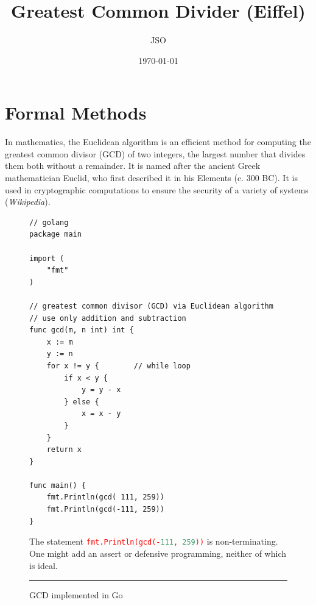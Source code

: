 \documentclass[runningheads,12pt]{article}
\newcommand{\e}[1]{\lstinline[language=eiffel]|#1|}
\begin{document}
\title{Greatest Common Divider (Eiffel)}
\author{JSO}
\date{\today}

\maketitle
\tableofcontents

\section{Formal Methods}

In mathematics, the Euclidean algorithm is an efficient method for computing the greatest common divisor (GCD) of two integers, the largest number that divides them both without a remainder. It is named after the ancient Greek mathematician Euclid, who first described it in his Elements (c. 300 BC). It is used in cryptographic computations to ensure the security of a variety of systems (\textit{Wikipedia}). 

\begin{figure}[!htb]
\begin{framed}
\begin{Verbatim}[fontsize=\small]
// golang
package main

import (
	"fmt"
)

// greatest common divisor (GCD) via Euclidean algorithm
// use only addition and subtraction 
func gcd(m, n int) int {
	x := m
	y := n
	for x != y {		// while loop
		if x < y {
			y = y - x
		} else {
			x = x - y
		}
	}
	return x
}

func main() {
	fmt.Println(gcd( 111, 259))
	fmt.Println(gcd(-111, 259))
}	
\end{Verbatim}
\end{framed}
The statement \textcolor{red}{\e{fmt.Println(gcd(-111, 259))}} is non-terminating. One might add an assert or defensive programming, neither of which is ideal. 
\caption{GCD implemented in Go}
\label{fig:gcd-c}
\noindent\rule{\textwidth}{0.5pt}
\end{figure}
\end{document}
